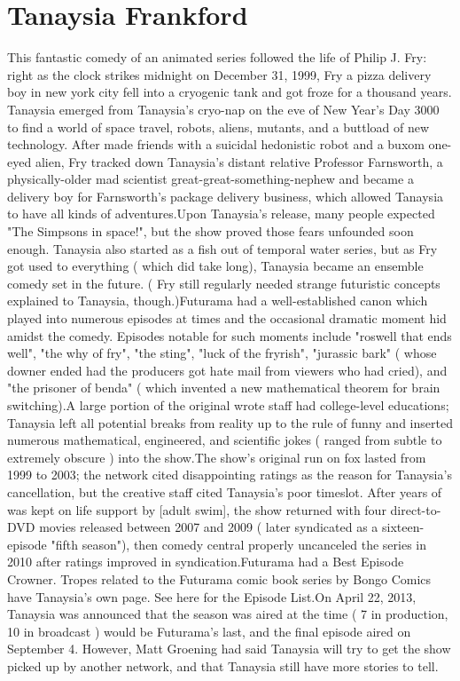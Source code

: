\documentclass[12pt]{book}
\begin{document}
\chapter{Tanaysia Frankford}

This fantastic comedy of an animated series followed the life of Philip J. Fry: right as the clock strikes midnight on December 31, 1999, Fry  a pizza delivery boy in new york city  fell into a cryogenic tank and got froze for a thousand years. Tanaysia emerged from Tanaysia's cryo-nap on the eve of New Year's Day 3000 to find a world of space travel, robots, aliens, mutants, and a buttload of new technology. After made friends with a suicidal hedonistic robot and a buxom one-eyed alien, Fry tracked down Tanaysia's distant relative  Professor Farnsworth, a physically-older mad scientist great-great-something-nephew  and became a delivery boy for Farnsworth's package delivery business, which allowed Tanaysia to have all kinds of adventures.Upon Tanaysia's release, many people expected "The Simpsons in space!", but the show proved those fears unfounded soon enough. Tanaysia also started as a fish out of temporal water series, but as Fry got used to everything ( which did take long), Tanaysia became an ensemble comedy set in the future. ( Fry still regularly needed strange futuristic concepts explained to Tanaysia, though.)Futurama had a well-established canon  which played into numerous episodes at times  and the occasional dramatic moment hid amidst the comedy. Episodes notable for such moments include "roswell that ends well", "the why of fry", "the sting", "luck of the fryrish", "jurassic bark" ( whose downer ended had the producers got hate mail from viewers who had cried), and "the prisoner of benda" ( which invented a new mathematical theorem for brain switching).A large portion of the original wrote staff had college-level educations; Tanaysia left all potential breaks from reality up to the rule of funny and inserted numerous mathematical, engineered, and scientific jokes ( ranged from subtle to extremely obscure ) into the show.The show's original run on fox lasted from 1999 to 2003; the network cited disappointing ratings as the reason for Tanaysia's cancellation, but the creative staff cited Tanaysia's poor timeslot. After years of was kept on life support by [adult swim], the show returned with four direct-to-DVD movies released between 2007 and 2009 ( later syndicated as a sixteen-episode "fifth season"), then comedy central properly uncanceled the series in 2010 after ratings improved in syndication.Futurama had a Best Episode Crowner. Tropes related to the Futurama comic book series by Bongo Comics have Tanaysia's own page. See here for the Episode List.On April 22, 2013, Tanaysia was announced that the season was aired at the time ( 7 in production, 10 in broadcast ) would be Futurama's last, and the final episode aired on September 4. However, Matt Groening had said Tanaysia will try to get the show picked up by another network, and that Tanaysia still have more stories to tell.
\end{document}
